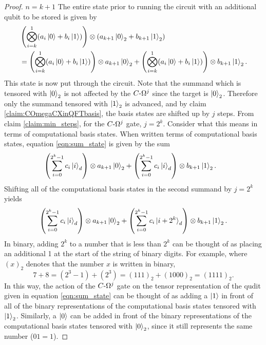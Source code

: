 \begin{proof}
    $n=k+1$\newline
    The entire state prior to running the circuit with an additional qubit to be stored is given by
    \begin{align}
        &\left(\bigotimes_{i = k}^{1}(a_i\ket{0} + b_i\ket{1})\right)\otimes(a_{k+1}\ket{0}_2 + b_{k+1}\ket{1}_2)\\
        &=\left(\bigotimes_{i = k}^{1}(a_i\ket{0} + b_i\ket{1})\right)\otimes a_{k+1}\ket{0}_2\label{eqn:sum_state}
        +
        \left(\bigotimes_{i = k}^{1}(a_i\ket{0} + b_i\ket{1})\right)\otimes b_{k+1}\ket{1}_2.
    \end{align}
    This state is now put through the circuit.
    Note that the summand which is tensored with $\ket{0}_2$ is not affected by the $C\text{-}\Omega^j$ since the target is $\ket{0}_2$.
    Therefore only the summand tensored with $\ket{1}_2$ is advanced, and by claim \ref{claim:COmegaCXinQFTbasis}, the basis states are shifted up by $j$ steps.
    From claim \ref{claim:min_steps}, for the $C\text{-}\Omega^j$ gate, $j = 2^k$.
    Consider what this means in terms of computational basis states.
    When written terms of computational basis states, equation \ref{eqn:sum_state} is given by the sum
    \begin{align}
        &\left(\sum_{i=0}^{2^k - 1}c_i\ket{i}_d\right) \otimes a_{k+1}\ket{0}_2
        +\left(\sum_{i=0}^{2^k - 1}c_i\ket{i}_d\right) \otimes b_{k+1}\ket{1}_2.
    \end{align}
    Shifting all of the computational basis states in the second summand by $j=2^k$ yields
    \begin{align}
        \left(\sum_{i=0}^{2^k - 1}c_i\ket{i}_d\right) \otimes a_{k+1}\ket{0}_2
        +\left(\sum_{i=0}^{2^k - 1}c_i\ket{i + 2^k}_d\right) \otimes b_{k+1}\ket{1}_2.
    \end{align}
    In binary, adding $2^k$ to a number that is less than $2^k$ can be thought of as placing an additional 1 at the start of the string of binary digits.
    For example, where $(x)_2$ denotes that the number $x$ is written in binary,
    \begin{equation}
        7 + 8 = (2^3 - 1) + (2^3) = (111)_2 + (1000)_2 = (1111)_2.
    \end{equation}
    In this way, the action of the $C\text{-}\Omega^j$ gate on the tensor representation of the qudit given in equation \ref{eqn:sum_state} can be thought of as adding a $\ket{1}$ in front of all of the binary representations of the computational basis states tensored with $\ket{1}_2$.
    Similarly, a $\ket{0}$ can be added in front of the binary representations of the computational basis states tensored with $\ket{0}_2$, since it still represents the same number ($01 = 1$).

\end{proof}
